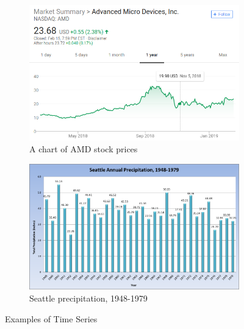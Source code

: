 \documentclass[oneside,12pt,openany]{book}
\begin{document}
	\begin{figure}[h!]
		\centering
		\begin{subfigure}[b]{.45\textwidth}
			\includegraphics[width=\textwidth]{images/AMDChart.png}
			\caption{A chart of AMD stock prices}
			\label{AMD Chart}
		\end{subfigure}
		\begin{subfigure}[b]{.45\textwidth}
			\includegraphics[width=\textwidth]{images/SeattleRainfall.png}
			\caption{Seattle precipitation, 1948-1979}
			\label{AMD Chart}
		\end{subfigure}
		\caption[Examples of Time Series]{Examples of Time Series \footnotemark}
		\label{TimeSeriesExamples}
			
	\end{figure}
	
\end{document}
